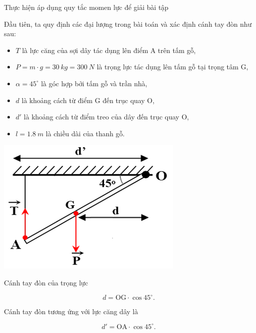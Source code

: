 \begin{dang}{Thực hiện áp dụng quy tắc momen lực để giải bài tập}
{		Đầu tiên, ta quy định các đại lượng trong bài toán và xác định cánh tay đòn như sau: 
		\begin{itemize}
			\item $T$ là lực căng của sợi dây tác dụng lên điểm A trên tấm gỗ, 
			\item $P=m\cdot g= \SI{30}{kg} = \SI{300}{N}$ là trọng lực tác dụng lên tấm gỗ tại trọng tâm G, 
			\item $\alpha = 45^{\circ}$ là góc hợp bởi tấm gỗ và trần nhà, 
			\item $d$ là khoảng cách từ điểm G đến trục quay O,
			\item $d'$ là khoảng cách từ điểm treo của dây đến trục quay O,
			\item $l=\SI{1,8}{m}$ là chiều dài của thanh gỗ. 
		\end{itemize}
		\begin{center}
			\includegraphics[scale=0.7]{../figs/VN10-PH-21-L-016-2-V2-03.png}
		\end{center}
		Cánh tay đòn của trọng lực
		
		$$d=\textrm{OG}\cdot\cos 45^{\circ}.$$
		
		Cánh tay đòn tương ứng với lực căng dây là
		
		$$d' = \textrm{OA}\cdot \cos 45^{\circ} .$$
		
}
\end{dang}
